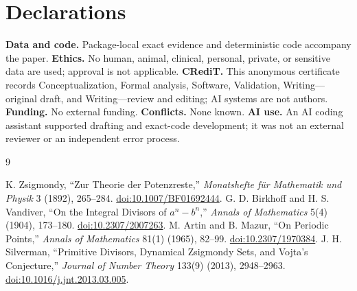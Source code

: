 \documentclass[10pt]{article}
\begin{document}
\section*{Declarations}
\small
\textbf{Data and code.} Package-local exact evidence and deterministic code
accompany the paper.  \textbf{Ethics.} No human, animal, clinical, personal,
private, or sensitive data are used; approval is not applicable.
\textbf{CRediT.} This anonymous certificate records Conceptualization,
Formal analysis, Software, Validation, Writing---original draft, and
Writing---review and editing; AI systems are not authors.  \textbf{Funding.}
No external funding.  \textbf{Conflicts.} None known.  \textbf{AI use.} An
AI coding assistant supported drafting and exact-code development; it was
not an external reviewer or an independent error process.

\begin{thebibliography}{9}\small\raggedright
{}
K. Zsigmondy, ``Zur Theorie der Potenzreste,'' \emph{Monatshefte f\"ur
Mathematik und Physik} 3 (1892), 265--284.
\href{https://doi.org/10.1007/BF01692444}{doi:10.1007/BF01692444}.
G. D. Birkhoff and H. S. Vandiver, ``On the Integral Divisors of
$a^n-b^n$,'' \emph{Annals of Mathematics} 5(4) (1904), 173--180.
\href{https://doi.org/10.2307/2007263}{doi:10.2307/2007263}.
M. Artin and B. Mazur, ``On Periodic Points,'' \emph{Annals of Mathematics}
81(1) (1965), 82--99.
\href{https://doi.org/10.2307/1970384}{doi:10.2307/1970384}.
J. H. Silverman, ``Primitive Divisors, Dynamical Zsigmondy Sets, and Vojta's
Conjecture,'' \emph{Journal of Number Theory} 133(9) (2013), 2948--2963.
\href{https://doi.org/10.1016/j.jnt.2013.03.005}{doi:10.1016/j.jnt.2013.03.005}.
\end{thebibliography}
\end{document}
